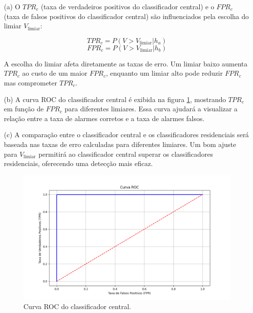 \documentclass[12 pt]{article}
\begin{document}
\begin{enumerate}
\begin{tcolorbox}[colback=white, colframe=black, title=Resposta:]

(a) O \( TPR_c \) (taxa de verdadeiros positivos do classificador central) e o \( FPR_c \) (taxa de falsos positivos do classificador central) são influenciados pela escolha do limiar \( V_{\text{limiar}} \):

$$
TPR_c = P(V > V_{\text{limiar}} | h_a)
$$
$$
FPR_c = P(V > V_{\text{limiar}} | h_b)
$$

A escolha do limiar afeta diretamente as taxas de erro. Um limiar baixo aumenta \( TPR_c \) ao custo de um maior \( FPR_c \), enquanto um limiar alto pode reduzir \( FPR_c \) mas comprometer \( TPR_c \).

(b) A curva ROC do classificador central é exibida na figura \ref{fig:roc}, mostrando \( TPR_c \) em função de \( FPR_c \) para diferentes limiares. Essa curva ajudará a visualizar a relação entre a taxa de alarmes corretos e a taxa de alarmes falsos.

(c) A comparação entre o classificador central e os classificadores residenciais será baseada nas taxas de erro calculadas para diferentes limiares. Um bom ajuste para \( V_{\text{limiar}} \) permitirá ao classificador central superar os classificadores residenciais, oferecendo uma detecção mais eficaz.

\end{tcolorbox}

\begin{figure}[H]
    \centering
    \includegraphics[width=\textwidth]{fig/item_10.png}
    \caption{Curva ROC do classificador central.}
    \label{fig:roc}
\end{figure}

\end{enumerate}
\end{document}
